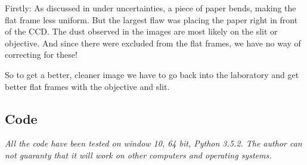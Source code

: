 \documentclass{emulateapj}
\begin{document}
Firstly: As discussed in under uncertainties, a piece of paper bends, making the flat frame less uniform. But the largest flaw was placing the paper right in front of the CCD. The dust observed in the images are most likely on the slit or objective. And since there were excluded from the flat frames, we have no way of correcting for these!

So to get a better, cleaner image we have to go back into the laboratory and get better flat frames with the objective and slit.


\begin{widetext}
\newpage
\section{Code}
\label{sec:code}
\textit{All the code have been tested on window 10, 64 bit, Python 3.5.2. The author can not guaranty that it will work on other computers and operating systems.}

\end{widetext}
\end{document}
